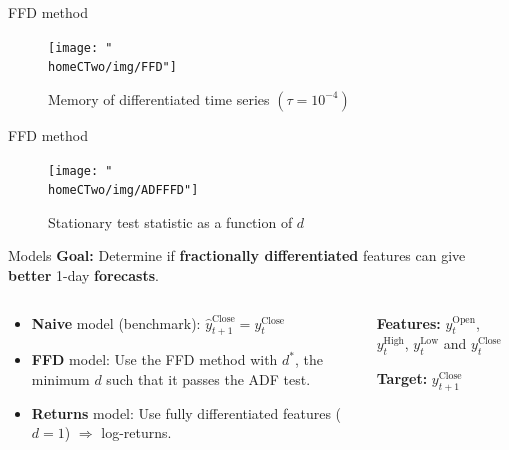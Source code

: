 \documentclass[usenames,dvipsnames]{beamer} %
\newcommand{\homeCTwo}{../../Chapter 2 - FracDiff/Draft}
\begin{document}
\begin{frame}{FFD method}
	\begin{figure}
		\centering
		\texttt{[image: "\\homeCTwo/img/FFD"]}
		\caption{Memory of differentiated time series $\left( \tau = 10^{-4}
		\right)$}
	\end{figure}
\end{frame}

\begin{frame}{FFD method}
	\begin{figure}
		\centering
		\texttt{[image: "\\homeCTwo/img/ADFFFD"]}
		\caption{Stationary test statistic as a function of $d$}
	\end{figure}
\end{frame}


\begin{frame}{Models}
\textbf{Goal:} Determine if \textbf{fractionally differentiated} features can 
give \textbf{better} 1-day \textbf{forecasts}.

\begin{columns}
\begin{column}{.45\textwidth}
\begin{itemize}
	\item \textbf{Naive} model (benchmark): 
	\vspace{.05cm} 
	\newline $\widehat{y}_{t+1}^{\text{Close}} = y_t^{\text{Close}}$
	
	\vspace{.25cm}
	\item \textbf{FFD} model: Use the FFD method with $d^*$, the minimum 
	$d$ such that it passes the ADF test.
	
	\vspace{.25cm}
	\item \textbf{Returns} model: Use fully differentiated features 
	($d = 1$) $\Rightarrow$ log-returns.
\end{itemize}
\end{column}

\begin{column}{.45\textwidth}
	\textbf{Features:} $y_t^{\text{Open}}$, $y_t^{\text{High}}$, 
	$y_t^{\text{Low}}$ and $y_t^{\text{Close}}$

	\vspace{.25cm}
	\textbf{Target:} $y_{t+1}^{\text{Close}}$
	\vfill
\end{column}
\end{columns}

\end{frame}
\end{document}
